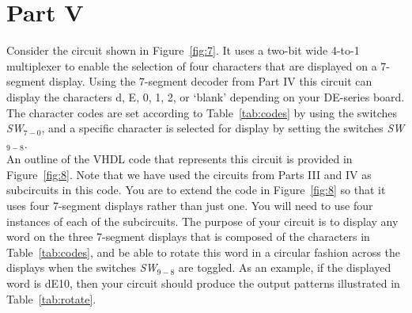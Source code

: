 \documentclass[epsfig,10pt,fullpage]{article}
\begin{document}
\newpage
\section*{Part V}
Consider the circuit shown in  Figure~\ref{fig:7}. It uses a two-bit wide 4-to-1 multiplexer to
enable the selection of four characters that are displayed on a 7-segment display. Using the
7-segment decoder from Part IV this circuit can display the characters d, E, 0, 1, 2, or `blank' 
depending on your DE-series board.
The character codes are set according to Table~\ref{tab:codes} by using the switches 
{\it SW}$_{7-0}$, and a specific character is selected for display by setting the
switches {\it SW}$_{9-8}$.
~\\

An outline of the VHDL code that represents this circuit is 
provided in  Figure~\ref{fig:8}. Note that we have
used the circuits from Parts III and IV as subcircuits in this code. You are to
extend the code in  Figure~\ref{fig:8} so that it uses four 7-segment displays rather 
than just one.  You will need to use four instances of each of the subcircuits. The
purpose of your circuit is to display any word on the three 7-segment displays that is 
composed of the characters in Table~\ref{tab:codes}, and be able to rotate this word in a 
circular fashion across the
displays when the switches {\it SW}$_{9-8}$ are toggled. As an example,
if the displayed word is dE10, then your circuit should produce the output patterns
illustrated in Table~\ref{tab:rotate}.
\end{document}
